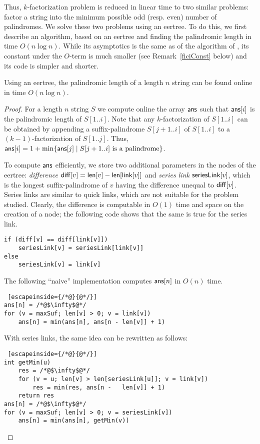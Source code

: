 \documentclass{llncs}
\def\len{{\sf len}}
\def\link{{\sf link}}
\def\series{{\sf seriesLink}}
\def\ans{{\sf ans}}
\def\diff{{\sf diff}}
\begin{document}
Thus, $k$-factorization problem is reduced in linear time to two similar problems: factor a string into the minimum possible odd (resp. even) number of palindromes. We solve these two problems using an eertree. To do this, we first describe an algorithm, based on an eertree and finding the palindromic length in time $O(n \log n)$. While its asymptotics is the same as of the algorithm of \cite{FGKK14}, its constant under the $O$-term is much smaller (see Remark~\ref{ficiConst} below) and its code is simpler and shorter.

\begin{proposition}
Using an eertree, the palindromic length of a length $n$ string can be found online in time $O(n\log n)$. 
\end{proposition}

\begin{proof}
For a length $n$ string $S$ we compute online the array $\ans$ such that $\ans[i]$ is the palindromic length of $S[1..i]$. Note that any $k$-factorization of $S[1..i]$ can be obtained by appending a suffix-palindrome $S[j{+}1..i]$ of $S[1..i]$ to a $(k{-}1)$-factorization of $S[1..j]$. Thus, $\ans[i]=1+\min\{\ans[j]\mid S[j+1..i] \text{ is a palindrome}\}$.

To compute $\ans$ efficiently, we store two additional parameters in the nodes of the eertree: \emph{difference} $\diff[v] = \len[v] - \len[\link[v]]$ and \emph{series link} $\series[v]$, which is the longest suffix-palindrome of $v$ having the difference unequal to $\diff[v]$. Series links are similar to quick links, which are not suitable for the problem studied. Clearly, the difference is computable in $O(1)$ time and space on the creation of a node; the following code shows that the same is true for the series link.

\begin{lstlisting}
if (diff[v] == diff[link[v]])
	seriesLink[v] = seriesLink[link[v]]
else 
	seriesLink[v] = link[v]
\end{lstlisting}

The following ``naive'' implementation computes $\ans[n]$ in $O(n)$ time.
\begin{lstlisting} [escapeinside={/*@}{@*/}]
ans[n] = /*@$\infty$@*/ 
for (v = maxSuf; len[v] > 0; v = link[v])
	ans[n] = min(ans[n], ans[n - len[v]] + 1)
\end{lstlisting}

With series links, the same idea can be rewritten as follows:
\begin{lstlisting} [escapeinside={/*@}{@*/}]
int getMin(u)
	res = /*@$\infty$@*/ 
	for (v = u; len[v] > len[seriesLink[u]]; v = link[v])
		res = min(res, ans[n -	 len[v]] + 1)
	return res
ans[n] = /*@$\infty$@*/ 
for (v = maxSuf; len[v] > 0; v = seriesLink[v])
	ans[n] = min(ans[n], getMin(v))
\end{lstlisting}


\end{proof}
\end{document}

